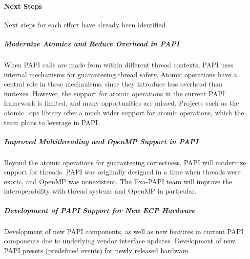  

\paragraph{Next Steps}
Next steps for each effort have already been identified.

\subparagraph{Modernize Atomics and Reduce Overhead in PAPI} 
	When PAPI calls are made from within different thread contexts, PAPI uses internal 
	mechanisms for guaranteeing thread safety. 
	Atomic operations have a central role in these mechanisms, since they introduce less 
	overhead than mutexes. 
	However, the support for atomic operations in the current PAPI framework is limited, 
	and many opportunities are missed. Projects such as the atomic\_ops library offer a 
	much wider support for atomic operations, which the team plans to leverage in PAPI.

%
\subparagraph{Improved Multithreading and OpenMP Support in PAPI} 
	Beyond the atomic operations for guaranteeing correctness, PAPI will modernize 
	support for threads. PAPI was originally designed in a time when threads were exotic, 
	and OpenMP was nonexistent. The Exa-PAPI team will improve the interoperability with 
	thread systems and OpenMP in particular.

%
\subparagraph{Development of PAPI Support for New ECP Hardware}
	Development of new PAPI components, as well as new features in current PAPI 
	components due to underlying vendor interface updates. Development of new PAPI 
	presets (predefined events) for newly released hardware.

